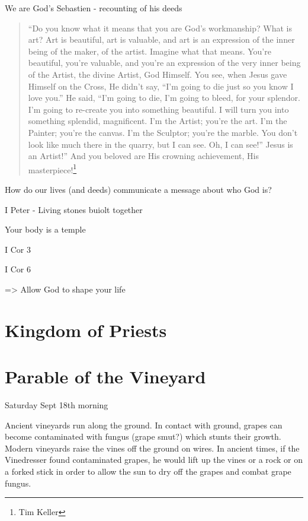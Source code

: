 \documentclass[
]{book}
\begin{document}
We are God's Sebastien - recounting of his deeds

\begin{quote}
``Do you know what it means that you are God's workmanship? What is art? Art is beautiful, art is valuable, and art is an expression of the inner being of the maker, of the artist. Imagine what that means. You're beautiful, you're valuable, and you're an expression of the very inner being of the Artist, the divine Artist, God Himself. You see, when Jesus gave Himself on the Cross, He didn't say, ``I'm going to die just so you know I love you.'' He said, ``I'm going to die, I'm going to bleed, for your splendor. I'm going to re-create you into something beautiful. I will turn you into something splendid, magnificent. I'm the Artist; you're the art. I'm the Painter; you're the canvas. I'm the Sculptor; you're the marble. You don't look like much there in the quarry, but I can see. Oh, I can see!'' Jesus is an Artist!'' And you beloved are His crowning achievement, His masterpiece!\footnote{Tim Keller}
\end{quote}

How do our lives (and deeds) communicate a message about who God is?

I Peter - Living stones buiolt together

Your body is a temple

I Cor 3

I Cor 6

=\textgreater{} Allow God to shape your life

\hypertarget{kingdom-of-priests}{%
\section{Kingdom of Priests}\label{kingdom-of-priests}}

\hypertarget{parable-of-the-vineyard}{%
\section{Parable of the Vineyard}\label{parable-of-the-vineyard}}

Saturday Sept 18th morning

Ancient vineyards run along the ground. In contact with ground, grapes can become contaminated with fungus (grape smut?) which stunts their growth. Modern vineyards raise the vines off the ground on wires. In ancient times, if the Vinedresser found contaminated grapes, he would lift up the vines or a rock or on a forked stick in order to allow the sun to dry off the grapes and combat grape fungus.
\end{document}
